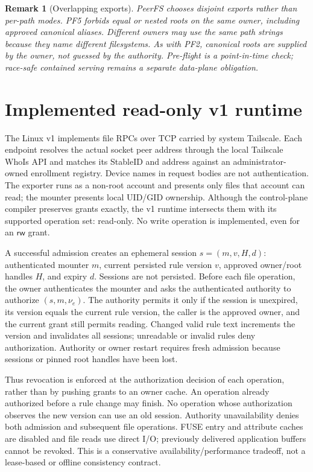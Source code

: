\documentclass[11pt]{article}
\newcommand{\RW}{\mathsf{rw}}
\newcommand{\PF}[1]{\textsf{PF#1}}
\theoremstyle{definitionbreak}
\theoremstyle{plainbreak}
\theoremstyle{remarkbreak}
\newtheorem{remark}[definition]{Remark}
\begin{document}
\begin{remark}[Overlapping exports]
PeerFS chooses disjoint exports rather than per-path modes. \PF{5} forbids equal or nested
roots on the same owner, including approved canonical aliases. Different owners may use the
same path strings because they name different filesystems. As with \PF{2}, canonical roots
are supplied by the owner, not guessed by the authority. Pre-flight is a point-in-time check;
race-safe contained serving remains a separate data-plane obligation.
\end{remark}

\section{Implemented read-only v1 runtime}

The Linux v1 implements file RPCs over TCP carried by system Tailscale. Each endpoint resolves
the actual socket peer address through the local Tailscale WhoIs API and matches its StableID
and address against an administrator-owned enrollment registry. Device names in request bodies
are not authentication. The exporter runs as a non-root account and presents only files that
account can read; the mounter presents local UID/GID ownership. Although the control-plane
compiler preserves grants exactly, the v1 runtime intersects them with its supported operation
set: read-only. No write operation is implemented, even for an $\RW$ grant.

A successful admission creates an ephemeral session
$s = (m, v, H, d)$: authenticated mounter $m$, current persisted rule version $v$, approved
owner/root handles $H$, and expiry $d$. Sessions are not persisted. Before each file operation,
the owner authenticates the mounter and asks the authenticated authority to authorize
$(s,m,\nu_e)$. The authority permits it only if the session is unexpired, its version equals
the current rule version, the caller is the approved owner, and the current grant still
permits reading. Changed valid rule text increments the version and invalidates all sessions;
unreadable or invalid rules deny authorization. Authority or owner restart requires fresh
admission because sessions or pinned root handles have been lost.

Thus revocation is enforced at the authorization decision of each operation, rather than by
pushing grants to an owner cache. An operation already authorized before a rule change may
finish. No operation whose authorization observes the new version can use an old session.
Authority unavailability denies both admission and subsequent file operations. FUSE entry and
attribute caches are disabled and file reads use direct I/O; previously delivered application
buffers cannot be revoked. This is a conservative availability/performance tradeoff, not a
lease-based or offline consistency contract.
\end{document}
